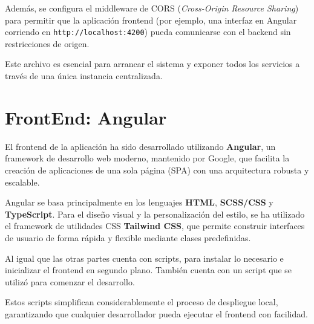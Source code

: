 Además, se configura el middleware de CORS (\textit{Cross-Origin Resource Sharing}) para permitir que la aplicación frontend (por ejemplo, una interfaz en Angular corriendo en \texttt{http://localhost:4200}) pueda comunicarse con el backend sin restricciones de origen.

Este archivo es esencial para arrancar el sistema y exponer todos los servicios a través de una única instancia centralizada.


\newpage

\section{FrontEnd: Angular}

El frontend de la aplicación ha sido desarrollado utilizando \textbf{Angular}, un framework de desarrollo web moderno, mantenido por Google, que facilita la creación de aplicaciones de una sola página (SPA) con una arquitectura robusta y escalable.

Angular se basa principalmente en los lenguajes \textbf{HTML}, \textbf{SCSS/CSS} y \textbf{TypeScript}. Para el diseño visual y la personalización del estilo, se ha utilizado el framework de utilidades CSS \textbf{Tailwind CSS}, que permite construir interfaces de usuario de forma rápida y flexible mediante clases predefinidas.

Al igual que las otras partes cuenta con scripts, para instalar lo necesario e inicializar el frontend en segundo plano. También cuenta con un script que se utilizó para comenzar el desarrollo.

Estos scripts simplifican considerablemente el proceso de despliegue local, garantizando que cualquier desarrollador pueda ejecutar el frontend con facilidad.

